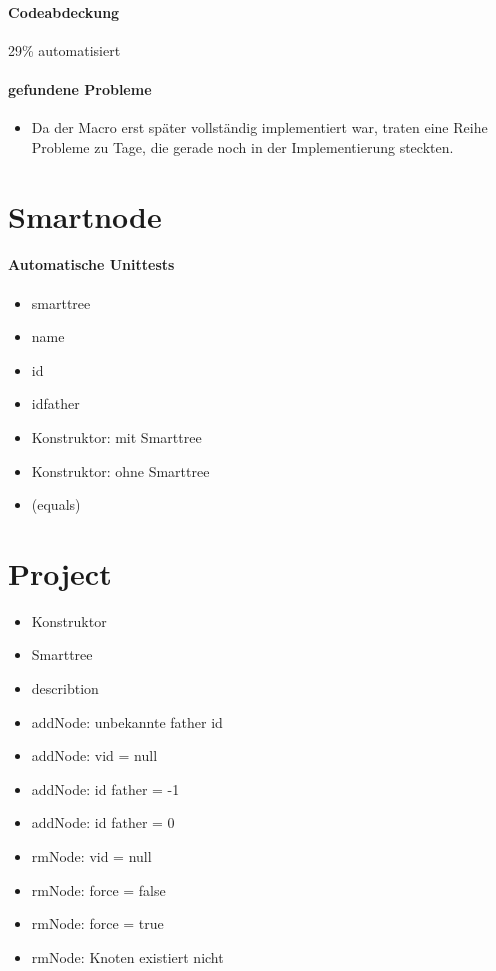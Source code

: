 \paragraph*{Codeabdeckung}
29\% automatisiert
\paragraph*{gefundene Probleme}
\begin{itemize}
\item Da der Macro erst später vollständig implementiert war, traten eine Reihe Probleme zu Tage, die gerade noch in der Implementierung steckten.
\end{itemize}





\section{Smartnode}
\paragraph{Automatische Unittests}
\begin{itemize}
\item smarttree
\item name
\item id
\item idfather
\item Konstruktor: mit Smarttree
\item Konstruktor: ohne Smarttree
\item (equals)
\end{itemize}
\section{Project}
\begin{itemize}
\paragraph{Automatische Unittests}
\item Konstruktor
\item Smarttree
\item describtion
\item addNode: unbekannte father id
\item addNode: vid = null
\item addNode: id father = -1
\item addNode: id father = 0
\item rmNode: vid = null
\item rmNode: force = false
\item rmNode: force = true
\item rmNode: Knoten existiert nicht
\end{itemize}
